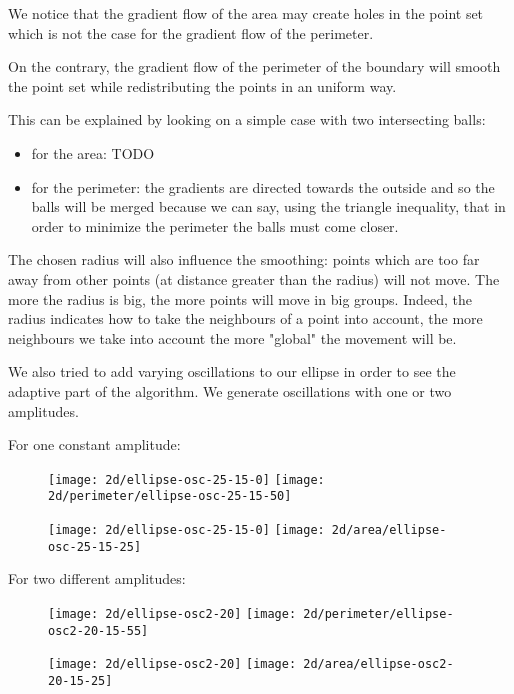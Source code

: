 We notice that the gradient flow of the area may create holes in the point set
which is not the case for the gradient flow of the perimeter.

On the contrary, the gradient flow of the perimeter of the boundary will smooth
the point set while redistributing the points in an uniform way.

This can be explained by looking on a simple case with two intersecting balls:
\begin{itemize}
    \item for the area: TODO
    \item for the perimeter: the gradients are directed towards the outside
        and so the balls will be merged because we can say, using the triangle
        inequality, that in order to minimize the perimeter the balls must come
        closer.
\end{itemize}

The chosen radius will also influence the smoothing: points which are too far
away from other points (at distance greater than the radius) will not move. The
more the radius is big, the more points will move in big groups. Indeed, the
radius indicates how to take the neighbours of a point into account, the more
neighbours we take into account the more "global" the movement will be.

We also tried to add varying oscillations to our ellipse in order to see the
adaptive part of the algorithm. We generate oscillations with one or two
amplitudes.

For one constant amplitude:

\begin{figure}[H]
    \centering

    \texttt{[image: 2d/ellipse-osc-25-15-0]}
    \texttt{[image: 2d/perimeter/ellipse-osc-25-15-50]}
    \label{fig:ellipse_osc_perimeter_flow}

    \texttt{[image: 2d/ellipse-osc-25-15-0]}
    \texttt{[image: 2d/area/ellipse-osc-25-15-25]}
    \label{fig:ellipse_osc_area_flow}
\end{figure}

For two different amplitudes:

\begin{figure}[H]
    \centering

    \texttt{[image: 2d/ellipse-osc2-20]}
    \texttt{[image: 2d/perimeter/ellipse-osc2-20-15-55]}
    \label{fig:ellipse_osc2_perimeter_flow}

    \texttt{[image: 2d/ellipse-osc2-20]}
    \texttt{[image: 2d/area/ellipse-osc2-20-15-25]}
    \label{fig:ellipse_osc2_area_flow}
\end{figure}

